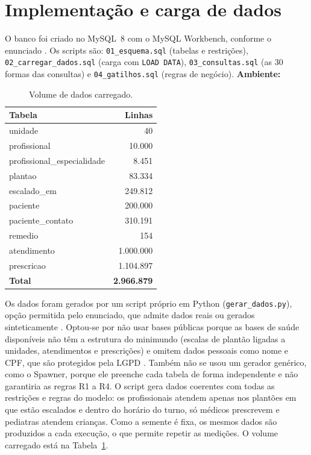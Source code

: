 \documentclass[10pt,a4paper]{article}
\begin{document}
\section{Implementação e carga de dados}\label{sec:implementacao}

O banco foi criado no MySQL~8 com o MySQL Workbench, conforme o enunciado \cite{enunciado}. Os scripts são: \texttt{01\_esquema.sql} (tabelas e restrições), \texttt{02\_carregar\_dados.sql} (carga com \texttt{LOAD DATA}), \texttt{03\_consultas.sql} (as 30 formas das consultas) e \texttt{04\_gatilhos.sql} (regras de negócio). \textbf{Ambiente:} %

\begin{table}
\vspace{-10pt}\centering\footnotesize
\caption{Volume de dados carregado.}
\label{tab:volume}
\begin{tabular}{lr}
\toprule
Tabela & Linhas \\
\midrule
unidade & 40 \\
profissional & 10.000 \\
profissional\_especialidade & 8.451 \\
plantao & 83.334 \\
escalado\_em & 249.812 \\
paciente & 200.000 \\
paciente\_contato & 310.191 \\
remedio & 154 \\
atendimento & 1.000.000 \\
prescricao & 1.104.897 \\
\midrule
\textbf{Total} & \textbf{2.966.879} \\
\bottomrule
\end{tabular}
\vspace{-8pt}
\end{table}

Os dados foram gerados por um script próprio em Python (\texttt{gerar\_dados.py}), opção permitida pelo enunciado, que admite dados reais ou gerados sinteticamente \cite{enunciado}. Optou-se por não usar bases públicas porque as bases de saúde disponíveis não têm a estrutura do minimundo (escalas de plantão ligadas a unidades, atendimentos e prescrições) e omitem dados pessoais como nome e CPF, que são protegidos pela LGPD \cite{lgpd}. Também não se usou um gerador genérico, como o Spawner, porque ele preenche cada tabela de forma independente e não garantiria as regras R1 a R4. O script gera dados coerentes com todas as restrições e regras do modelo: os profissionais atendem apenas nos plantões em que estão escalados e dentro do horário do turno, só médicos prescrevem e pediatras atendem crianças. Como a semente é fixa, os mesmos dados são produzidos a cada execução, o que permite repetir as medições. O volume carregado está na Tabela~\ref{tab:volume}.
\end{document}
